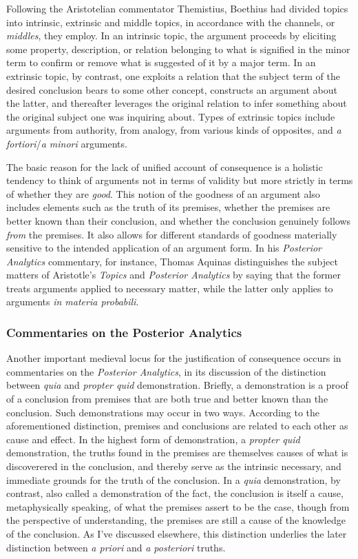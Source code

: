 \documentclass[a4paper,11pt]{article}
\begin{document}
Following the Aristotelian commentator Themistius, Boethius had divided topics into intrinsic, extrinsic and middle topics, in accordance with the channels, or \textit{middles}, they employ. In an intrinsic topic, the argument proceeds by eliciting some property, description, or relation belonging to what is signified in the minor term to confirm or remove what is suggested of it by a major term. In an extrinsic topic, by contrast, one exploits a relation that the subject term of the desired conclusion bears to some other concept, constructs an argument about the latter, and thereafter leverages the original relation to infer something about the original subject one was inquiring about. Types of extrinsic topics include arguments from authority, from analogy, from various kinds of opposites, and \textit{a fortiori}/\textit{a minori} arguments.


The basic reason for the lack of unified account of consequence is a holistic tendency to think of arguments not in terms of validity but more strictly in terms of whether they are \textit{good}. This notion of the goodness of an argument also includes elements such as the truth of its premises, whether the premises are better known than their conclusion, and whether the conclusion genuinely follows \textit{from} the premises. It also allows for different standards of goodness materially sensitive to the intended application of an argument form. In his \textit{Posterior Analytics} commentary, for instance, Thomas Aquinas distinguishes the subject matters of Aristotle's \textit{Topics} and \textit{Posterior Analytics} by saying that the former treats arguments applied to necessary matter, while the latter only applies to arguments \textit{in materia probabili}. 

\subsubsection{Commentaries on the Posterior Analytics}
Another important medieval locus for the justification of consequence occurs in commentaries on the \textit{Posterior Analytics}, in its discussion of the distinction between \textit{quia} and \textit{propter quid} demonstration. Briefly, a demonstration is a proof of a conclusion from premises that are both true and better known than the conclusion. Such demonstrations may occur in two ways. According to the aforementioned distinction, premises and conclusions are related to each other as cause and effect. In the highest form of demonstration, a \textit{propter quid} demonstration, the truths found in the premises are themselves causes of what is discoverered in the conclusion, and thereby serve as the intrinsic necessary, and immediate grounds for the truth of the conclusion. In a \textit{quia} demonstration, by contrast, also called a demonstration of the fact, the conclusion is itself a cause, metaphysically speaking, of what the premises assert to be the case, though from the perspective of understanding, the premises are still a cause of the knowledge of the conclusion. As I've discussed elsewhere, this distinction underlies the later distinction between \textit{a priori} and \textit{a posteriori} truths.
\end{document}
